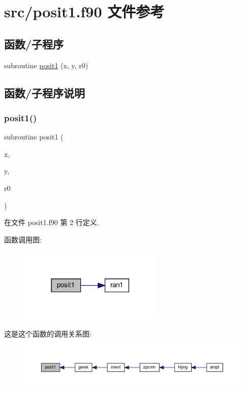 \hypertarget{posit1_8f90}{}\section{src/posit1.f90 文件参考}
\label{posit1_8f90}
\subsection*{函数/子程序}
\begin{DoxyCompactItemize}
\item 
subroutine \mbox{\hyperlink{posit1_8f90_a09f1e5c9c1401ff6d83f33aa7352b343}{posit1}} (x, y, r0)
\end{DoxyCompactItemize}


\subsection{函数/子程序说明}
\mbox{\label{posit1_8f90_a09f1e5c9c1401ff6d83f33aa7352b343}} 
\subsubsection{\texorpdfstring{posit1()}{posit1()}}
{\footnotesize\ttfamily subroutine posit1 (\begin{DoxyParamCaption}\item[{}]{x,  }\item[{}]{y,  }\item[{}]{r0 }\end{DoxyParamCaption})}



在文件 posit1.\+f90 第 2 行定义.

函数调用图\+:
\nopagebreak
\begin{figure}[H]
\begin{center}
\leavevmode
\includegraphics[width=194pt]{posit1_8f90_a09f1e5c9c1401ff6d83f33aa7352b343_cgraph}
\end{center}
\end{figure}
这是这个函数的调用关系图\+:
\nopagebreak
\begin{figure}[H]
\begin{center}
\leavevmode
\includegraphics[width=350pt]{posit1_8f90_a09f1e5c9c1401ff6d83f33aa7352b343_icgraph}
\end{center}
\end{figure}

